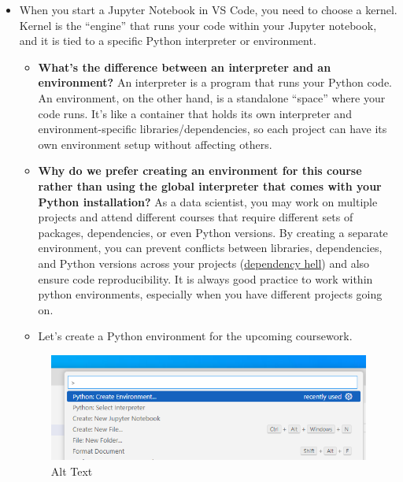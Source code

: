 \documentclass[
  letterpaper,
  DIV=11,
  numbers=noendperiod]{scrreprt}
\providecommand{\tightlist}{%
  \setlength{\itemsep}{0pt}\setlength{\parskip}{0pt}}\usepackage{longtable,booktabs,array}
\begin{document}
\begin{itemize}
\item
  When you start a Jupyter Notebook in VS Code, you need to choose a
  kernel. Kernel is the ``engine'' that runs your code within your
  Jupyter notebook, and it is tied to a specific Python interpreter or
  environment.

  \begin{itemize}
  \tightlist
  \item
    \textbf{What's the difference between an interpreter and an
    environment?} An interpreter is a program that runs your Python
    code. An environment, on the other hand, is a standalone ``space''
    where your code runs. It's like a container that holds its own
    interpreter and environment-specific libraries/dependencies, so each
    project can have its own environment setup without affecting others.
  \item
    \textbf{Why do we prefer creating an environment for this course
    rather than using the global interpreter that comes with your Python
    installation?} As a data scientist, you may work on multiple
    projects and attend different courses that require different sets of
    packages, dependencies, or even Python versions. By creating a
    separate environment, you can prevent conflicts between libraries,
    dependencies, and Python versions across your projects
    (\href{https://en.wikipedia.org/wiki/Dependency_hell}{dependency
    hell}) and also ensure code reproducibility. It is always good
    practice to work within python environments, especially when you
    have different projects going on.
  \item
    Let's create a Python environment for the upcoming coursework.
  \end{itemize}

  \begin{figure}

  {\centering \includegraphics{images/env_add.png}

  }

  \caption{Alt Text}


\end{figure}
\end{itemize}
\end{document}
